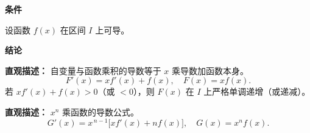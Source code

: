 \begin{statementbox}

	\textbf{\textcolor{CStatement}{条件}}
	\begin{description}[style=nextline, leftmargin=2.8em, labelsep=0.5em, itemsep=0.35em]
		\item[\textbf{\textcolor{CStatement}{条件1（函数可导性）：}}] 设函数 $f(x)$ 在区间 $I$ 上可导。
	\end{description}

	\textbf{\textcolor{CStatement}{结论}}
	\begin{description}[style=nextline, leftmargin=2.8em, labelsep=0.5em, itemsep=0.45em]
		\item[\textbf{\textcolor{CStatement}{结论一（导数公式）：}}]
			\textbf{\textcolor{CStatement}{直观描述：}}
			自变量与函数乘积的导数等于 $x$ 乘导数加函数本身。
			\[
				F'(x)=x f'(x)+f(x), \quad F(x)=x f(x).
			\]
			若 $x f'(x)+f(x) > 0$（或 $<0$），则 $F(x)$ 在 $I$ 上严格单调递增（或递减）。

		\item[\textbf{\textcolor{CStatement}{推广结论（$n$ 次幂推广）：}}]
			\textbf{\textcolor{CStatement}{直观描述：}}
			$x^n$ 乘函数的导数公式。
			\[
				G'(x)=x^{\,n-1}\bigl[x f'(x)+n f(x)\bigr], \quad G(x)=x^n f(x).
			\]
	\end{description}

\end{statementbox}
